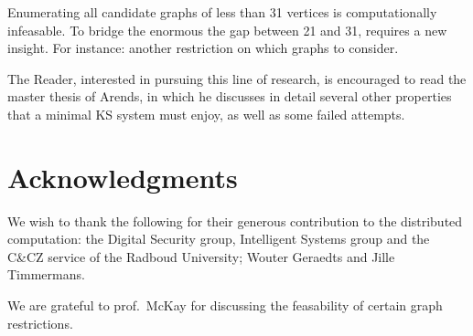 \documentclass[a4paper]{article}
\theoremstyle{definition}
\theoremstyle{remark}
\begin{document}
Enumerating all candidate graphs of less than 31 vertices
is computationally infeasable.
To bridge the enormous the gap between 21 and 31,
requires a new insight.
For instance: another restriction on which graphs to consider.

The Reader, interested in pursuing this line of research,
is encouraged to read the master thesis\cite{a09} of Arends,
in which he discusses in detail several other
properties that a minimal KS system must enjoy, as well as
some failed attempts.

\section{Acknowledgments}
We wish to thank the following for their generous contribution to the
distributed computation:
    the Digital Security group, Intelligent Systems group
    and the C\&CZ service of the Radboud University;
    Wouter Geraedts and
    Jille Timmermans.

We are grateful to prof.~McKay for discussing
the feasability of certain graph restrictions.

\appendix
\end{document}
